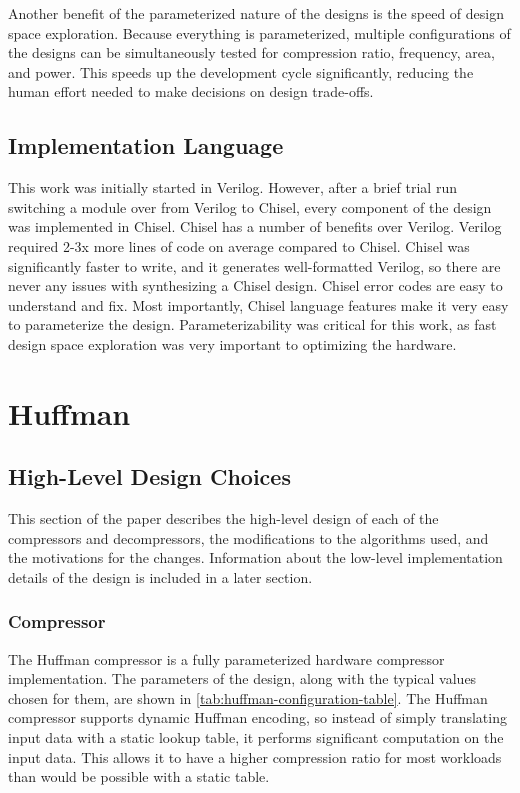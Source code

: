\documentclass[doublespace,nopageskip]{VTthesis}
\begin{document}
Another benefit of the parameterized nature of the designs is the speed of design space exploration. Because everything is parameterized, multiple configurations of the designs can be simultaneously tested for compression ratio, frequency, area, and power. This speeds up the development cycle significantly, reducing the human effort needed to make decisions on design trade-offs.

\subsection{Implementation Language}\label{ss:implementation_language}
This work was initially started in Verilog. However, after a brief trial run switching a module over from Verilog to Chisel, every component of the design was implemented in Chisel. Chisel has a number of benefits over Verilog. Verilog required 2-3x more lines of code on average compared to Chisel. Chisel was significantly faster to write, and it generates well-formatted Verilog, so there are never any issues with synthesizing a Chisel design. Chisel error codes are easy to understand and fix. Most importantly, Chisel language features make it very easy to parameterize the design. Parameterizability was critical for this work, as fast design space exploration was very important to optimizing the hardware.

\section{Huffman}\label{ss:huffman}
\subsection{High-Level Design Choices}\label{se:huffman_design_choices}
This section of the paper describes the high-level design of each of the compressors and decompressors, the modifications to the algorithms used, and the motivations for the changes. Information about the low-level implementation details of the design is included in a later section.

\subsubsection{Compressor}\label{sss:huffman_compressor_design}
The Huffman compressor is a fully parameterized hardware compressor implementation. The parameters of the design, along with the typical values chosen for them, are shown in \ref{tab:huffman-configuration-table}. The Huffman compressor supports dynamic Huffman encoding, so instead of simply translating input data with a static lookup table, it performs significant computation on the input data. This allows it to have a higher compression ratio for most workloads than would be possible with a static table.
\end{document}
